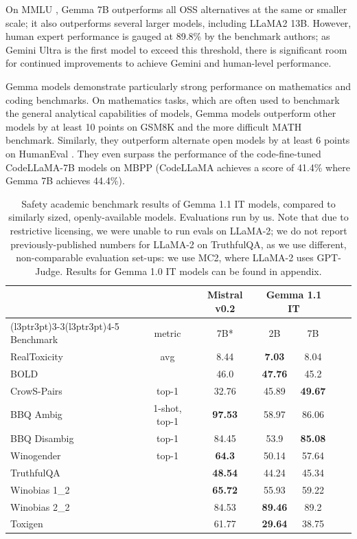 \documentclass[11pt, a4paper, logo, twocolumn, copyright, nonumbering]{googledeepmind}
\begin{document}
On MMLU \citep{mmlu}, Gemma 7B outperforms all OSS alternatives at the same or smaller scale; it also outperforms several larger models, including LLaMA2 13B. However, human expert performance is gauged at 89.8\% by the benchmark authors; as Gemini Ultra is the first model to exceed this threshold, there is significant room for continued improvements to achieve Gemini and human-level performance.

Gemma models demonstrate particularly strong performance on mathematics and coding benchmarks. On mathematics tasks, which are often used to benchmark the general analytical capabilities of models, Gemma models outperform other models by at least 10 points on GSM8K \citep{gsm8k} and the more difficult MATH \citep{hendrycksmath2021} benchmark. Similarly, they outperform alternate open models by at least 6 points on HumanEval \citep{humaneval}. They even surpass the performance of the code-fine-tuned CodeLLaMA-7B models on MBPP (CodeLLaMA achieves a score of 41.4\% where Gemma 7B achieves 44.4\%). 

\begin{table}
    \centering
    \begin{tabular}{l c c c  c c  c }
    \toprule
         & & Mistral v0.2 & \multicolumn{2}{c}{Gemma 1.1 IT}\\
        \cmidrule(l{3pt}r{3pt}){3-3}\cmidrule(l{3pt}r{3pt}){4-5}
Benchmark & metric  & 7B* & 2B & 7B \\
      \midrule
RealToxicity & avg & 8.44 & \textbf{7.03} & 8.04 \\
BOLD &  & 46.0 & \textbf{47.76} & 45.2  \\
CrowS-Pairs & top-1 & 32.76 & 45.89 & \textbf{49.67}  \\
BBQ Ambig & 1-shot, top-1 & \textbf{97.53} & 58.97 & 86.06 \\
BBQ Disambig & top-1 & 84.45 & 53.9 & \textbf{85.08} \\
Winogender & top-1 & \textbf{64.3} & 50.14 & 57.64 \\
TruthfulQA & & \textbf{48.54} & 44.24 & 45.34\\
Winobias 1\_2 &  & \textbf{65.72} & 55.93 & 59.22 \\
Winobias 2\_2 &  & 84.53 & \textbf{89.46} & 89.2 \\
Toxigen &  & 61.77 & \textbf{29.64} & 38.75 \\
\bottomrule
\end{tabular}
    \caption{Safety academic benchmark results of Gemma 1.1 IT models, compared to similarly sized, openly-available models. Evaluations run by us. Note that due to restrictive licensing, we were unable to run evals on LLaMA-2; we do not report previously-published numbers for LLaMA-2  on TruthfulQA, as we use different, non-comparable evaluation set-ups: we use MC2, where LLaMA-2 uses GPT-Judge. Results for Gemma 1.0 IT models can be found in appendix.
    }
    \label{tab:safety_auto_evals}
\end{table}
\end{document}
